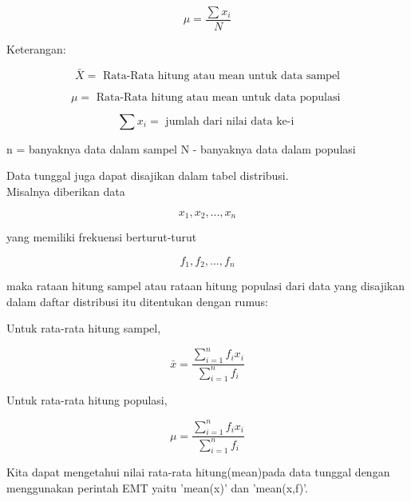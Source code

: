 \documentclass[a4paper,10pt]{article}
\begin{document}
\begin{eulernotebook}
\begin{eulerformula}
\[
\mu = \frac{\sum x_i}{N}
\]
\end{eulerformula}
\begin{eulercomment}
Keterangan:\\
\end{eulercomment}
\begin{eulerformula}
\[
\bar {X}=\mbox{ Rata-Rata hitung atau mean untuk data sampel}
\]
\end{eulerformula}
\begin{eulerformula}
\[
\mu=\mbox{ Rata-Rata hitung atau mean untuk data populasi }
\]
\end{eulerformula}
\begin{eulerformula}
\[
\sum x_i=\mbox{ jumlah dari nilai data ke-i }
\]
\end{eulerformula}
\begin{eulerttcomment}
           n = banyaknya data dalam sampel
           N - banyaknya data dalam populasi
\end{eulerttcomment}
\begin{eulercomment}
Data tunggal juga dapat disajikan dalam tabel distribusi.\\
Misalnya diberikan data\\
\end{eulercomment}
\begin{eulerformula}
\[
x_1,x_2,...,x_n
\]
\end{eulerformula}
\begin{eulercomment}
yang memiliki frekuensi berturut-turut\\
\end{eulercomment}
\begin{eulerformula}
\[
f_1,f_2,...,f_n
\]
\end{eulerformula}
\begin{eulercomment}
maka rataan hitung sampel atau rataan hitung populasi dari data yang
disajikan dalam daftar distribusi itu ditentukan dengan rumus:

Untuk rata-rata hitung sampel,

\end{eulercomment}
\begin{eulerformula}
\[
\bar{x}=\frac{\sum_{i=1}^{n} f_i x_i}{\sum_{i=1}^{n} f_i}
\]
\end{eulerformula}
\begin{eulercomment}
Untuk rata-rata hitung populasi,

\end{eulercomment}
\begin{eulerformula}
\[
\mu=\frac{\sum_{i=1}^{n} f_i x_i}{\sum_{i=1}^{n} f_i}
\]
\end{eulerformula}
\begin{eulercomment}
Kita dapat mengetahui nilai rata-rata hitung(mean)pada data tunggal
dengan menggunakan perintah EMT yaitu 'mean(x)' dan 'mean(x,f)'.


\end{eulercomment}
\end{eulernotebook}
\end{document}
